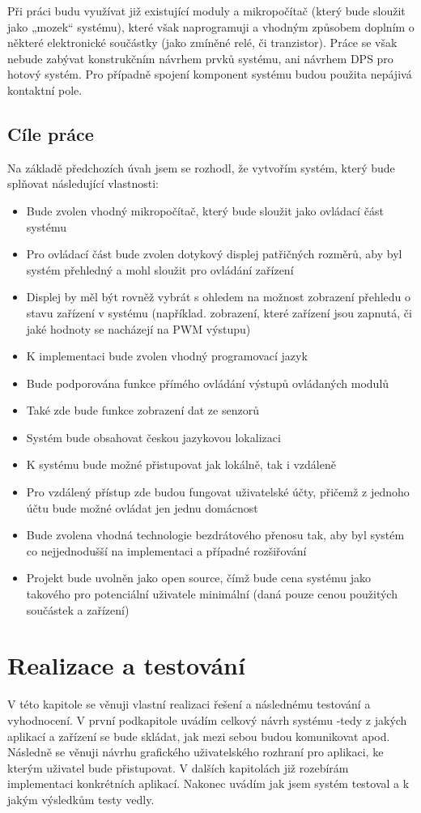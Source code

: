 Při práci budu využívat již existující moduly a mikropočítač (který bude sloužit jako „mozek“ systému), které však naprogramuji a vhodným způsobem doplním o některé elektronické součástky (jako zmíněné relé, či tranzistor). Práce se však nebude zabývat konstrukčním návrhem prvků systému, ani návrhem DPS pro hotový systém. Pro případně spojení komponent systému budou použita nepájivá kontaktní pole.

\section{Cíle práce}
Na základě předchozích úvah jsem se rozhodl, že vytvořím systém, který bude splňovat následující vlastnosti:

\begin{itemize}
    \item Bude zvolen vhodný mikropočítač, který bude sloužit jako ovládací část systému
    \item Pro ovládací část bude zvolen dotykový displej patřičných rozměrů, aby byl systém přehledný a mohl sloužit pro ovládání zařízení
    \item Displej by měl být rovněž vybrát s ohledem na možnost zobrazení přehledu o stavu zařízení v systému (například. zobrazení, které zařízení jsou zapnutá, či jaké hodnoty se nacházejí na PWM výstupu)
    \item K implementaci bude zvolen vhodný programovací jazyk
    \item Bude podporována funkce přímého ovládání výstupů ovládaných modulů
    \item Také zde bude funkce zobrazení dat ze senzorů
    \item Systém bude obsahovat českou jazykovou lokalizaci
    \item K systému bude možné přistupovat jak lokálně, tak i vzdáleně
    \item Pro vzdálený přístup zde budou fungovat uživatelské účty, přičemž z jednoho účtu bude možné ovládat jen jednu domácnost
    \item Bude zvolena vhodná technologie bezdrátového přenosu tak, aby byl systém co nejjednodušší na implementaci a případné rozšiřování
    \item Projekt bude uvolněn jako open source, čímž bude cena systému jako takového pro potenciální uživatele minimální (daná pouze cenou použitých součástek a zařízení)
\end{itemize}

\chapter{Realizace a testování}
V této kapitole se věnuji vlastní realizaci řešení a následnému testování a vyhodnocení. V první podkapitole uvádím celkový návrh systému -tedy z jakých aplikací a zařízení se bude skládat, jak mezi sebou budou komunikovat apod. Následně se věnuji návrhu grafického uživatelského rozhraní pro aplikaci, ke kterým uživatel bude přistupovat. V dalších kapitolách již rozebírám implementaci konkrétních aplikací. Nakonec uvádím jak jsem systém testoval a k jakým výsledkům testy vedly.
